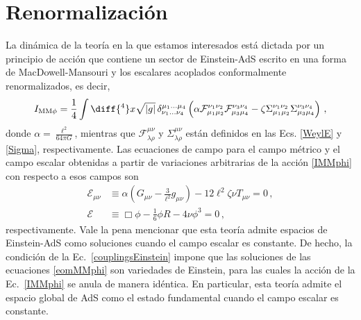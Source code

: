 \documentclass[../Main.tex]{subfiles}
\begin{document}
\section{Renormalización}
La dinámica de la teoría en la que estamos interesados está dictada por un principio de acción que contiene un sector de Einstein-AdS escrito en una forma de MacDowell-Mansouri y los escalares acoplados conformalmente renormalizados, es decir,
\begin{equation}\label{IMMphi}
    I_{\rm MM\phi} = \frac{1}{4}\int\diff{^4}x\sqrt{|g|}\,\delta^{\mu_1\ldots\mu_4}_{\nu_1\ldots\nu_4}\left(\alpha \mathcal{F}^{\nu_1\nu_2}_{\mu_1\mu_2}\mathcal{F}^{\nu_3\nu_4}_{\mu_3\mu_4} - \zeta \Sigma^{\nu_1\nu_2}_{\mu_1\mu_2}\Sigma^{\nu_3\nu_4}_{\mu_3\mu_4} \right)\,,
\end{equation}
donde $\alpha = \frac{\ell^2}{64 \pi G}$, mientras que $\mathcal{F}^{\mu\nu}_{\lambda\rho}$ y $\Sigma^{\mu\nu}_{\lambda\rho}$ están definidos en las Ecs. \eqref{WeylE} y \eqref{Sigma}, respectivamente. Las ecuaciones de campo para el campo métrico y el campo escalar obtenidas a partir de variaciones arbitrarias de la acción \eqref{IMMphi} con respecto a esos campos son
\begin{subequations}\label{eomMMphi}
\begin{align}\label{eomgMMphi}
    \mathcal{E}_{\mu\nu} &\equiv \alpha \left(G_{\mu\nu} - \frac{3}{\ell^2} g_{\mu\nu}\right)  - 12 \ell^{2}\zeta\nu  T_{\mu\nu} =0 \,, \\
    \label{eomphiMMphi}
    \mathcal{E} &\equiv \Box\phi - \frac{1}{6}\phi R - 4\nu\phi^3 = 0\,,
\end{align}    
\end{subequations}
respectivamente. Vale la pena mencionar que esta teoría admite espacios de Einstein-AdS como soluciones cuando el campo escalar es constante. De hecho, la condición de la Ec.~\eqref{couplingsEinstein} impone que las soluciones de las ecuaciones \eqref{eomMMphi} son variedades de Einstein, para las cuales la acción de la Ec.~\eqref{IMMphi} se anula de manera idéntica. En particular, esta teoría admite el espacio global de AdS como el estado fundamental cuando el campo escalar es constante.
\end{document}
